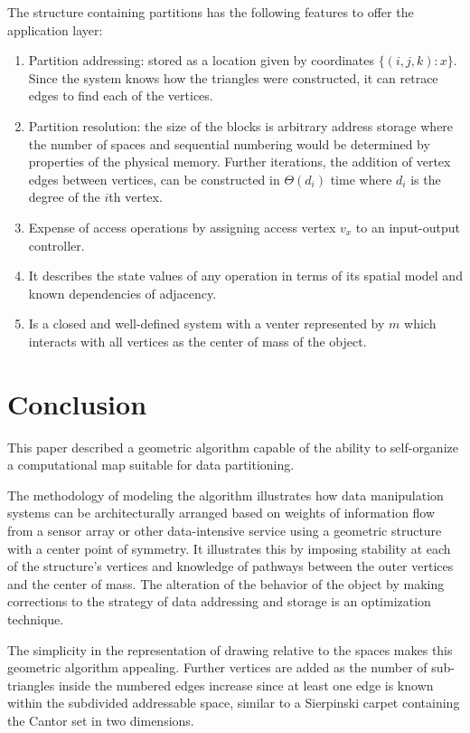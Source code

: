 \documentclass[11pt]{article}
\begin{document}
The structure containing partitions has the following features to offer the application layer:

\begin{enumerate}
\item Partition addressing: stored as a location given by coordinates $\{(i, j, k) : x\}$. Since the system knows how the triangles were constructed, it can retrace edges to find each of the vertices.
\item Partition resolution: the size of the blocks is arbitrary address storage where the number of spaces and sequential numbering would be determined by properties of the physical memory. Further iterations, the addition of vertex edges between vertices, can be constructed in $\Theta(d_i)$ time where $d_i$ is the degree of the $i$th vertex.
\item Expense of access operations by assigning access vertex $v_x$ to an input-output controller.
\item It describes the state values of any operation in terms of its spatial model and known dependencies of adjacency.
\item Is a closed and well-defined system with a venter represented by $m$ which interacts with all vertices as the center of mass of the object.
\end{enumerate}

\section{Conclusion}

This paper described a geometric algorithm capable of the ability to self-organize a computational map suitable for data partitioning.

The methodology of modeling the algorithm illustrates how data manipulation systems can be architecturally arranged based on weights of information flow from a sensor array or other data-intensive service using a geometric structure with a center point of symmetry. It illustrates this by imposing stability at each of the structure's vertices and knowledge of pathways between the outer vertices and the center of mass. The alteration of the behavior of the object by making corrections to the strategy of data addressing and storage is an optimization technique.

The simplicity in the representation of drawing relative to the spaces makes this geometric algorithm appealing. Further vertices are added as the number of sub-triangles inside the numbered edges increase since at least one edge is known within the subdivided addressable space, similar to a Sierpinski carpet containing the Cantor set in two dimensions.
\end{document}
